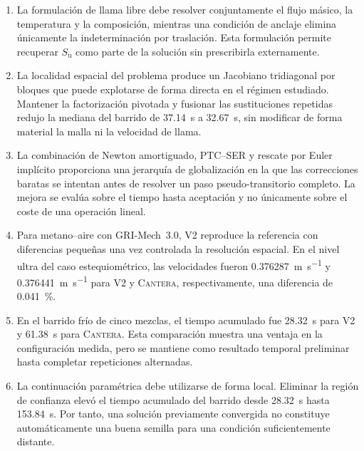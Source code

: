\documentclass[12pt,a4paper,twoside,openany]{book}
\newcommand{\Su}{S_{\mathrm{u}}}
\newcommand{\Vdos}{\textsc{V2}\xspace}
\newcommand{\Cantera}{\textsc{Cantera}\xspace}
\begin{document}
\begin{enumerate}
  \item La formulación de llama libre debe resolver conjuntamente el flujo
        másico, la temperatura y la composición, mientras una condición de
        anclaje elimina únicamente la indeterminación por traslación. Esta
        formulación permite recuperar \(\Su\) como parte de la solución sin
        prescribirla externamente.

  \item La localidad espacial del problema produce un Jacobiano tridiagonal por
        bloques que puede explotarse de forma directa en el régimen estudiado.
        Mantener la factorización pivotada y fusionar las sustituciones repetidas
        redujo la mediana del barrido de \SI{37.14}{\second} a
        \SI{32.67}{\second}, sin modificar de forma material la malla ni la
        velocidad de llama.

  \item La combinación de Newton amortiguado, PTC--SER y rescate por Euler
        implícito proporciona una jerarquía de globalización en la que las
        correcciones baratas se intentan antes de resolver un paso
        pseudo-transitorio completo. La mejora se evalúa sobre el tiempo hasta
        aceptación y no únicamente sobre el coste de una operación lineal.

  \item Para metano--aire con GRI-Mech~3.0, \Vdos reproduce la referencia con
        diferencias pequeñas una vez controlada la resolución espacial. En el
        nivel ultra del caso estequiométrico, las velocidades fueron
        \SI{0.376287}{\metre\per\second} y
        \SI{0.376441}{\metre\per\second} para \Vdos y \Cantera,
        respectivamente, una diferencia de \SI{0.041}{\percent}.

  \item En el barrido frío de cinco mezclas, el tiempo acumulado fue
        \SI{28.32}{\second} para \Vdos y \SI{61.38}{\second} para
        \Cantera. Esta comparación muestra una ventaja en la configuración
        medida, pero se mantiene como resultado temporal preliminar hasta
        completar repeticiones alternadas.

  \item La continuación paramétrica debe utilizarse de forma local. Eliminar
        la región de confianza elevó el tiempo acumulado del barrido desde
        \SI{28.32}{\second} hasta \SI{153.84}{\second}. Por tanto, una
        solución previamente convergida no constituye automáticamente una buena
        semilla para una condición suficientemente distante.


\end{enumerate}
\end{document}
